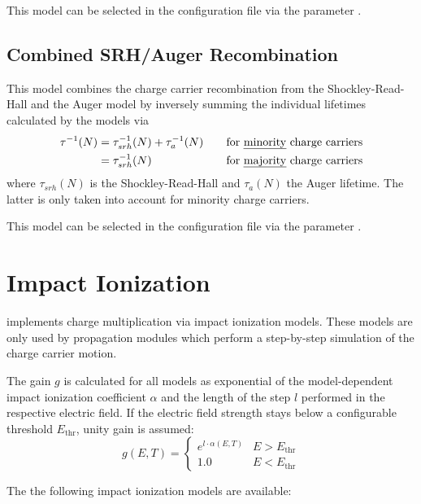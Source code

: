 This model can be selected in the configuration file via the parameter .

\subsection{Combined SRH/Auger Recombination}

This model combines the charge carrier recombination from the Shockley-Read-Hall and the Auger model by inversely summing the individual lifetimes calculated by the models via
\begin{align}
    \label{eq:recom:combined}
    \tau^{-1}(N) &= \tau_{srh}^{-1}(N) + \tau_{a}^{-1}(N) &\quad \textrm{for \emph{minority} charge carriers} \nonumber \\
              &= \tau_{srh}^{-1}(N) &\quad \textrm{for \emph{majority} charge carriers}
\end{align}
where $\tau_{srh}(N)$ is the Shockley-Read-Hall and $\tau_{a}(N)$ the Auger lifetime.
The latter is only taken into account for minority charge carriers.

This model can be selected in the configuration file via the parameter .


\section{Impact Ionization}
\label{sec:multiplication}

\apsq implements charge multiplication via impact ionization models.
These models are only used by propagation modules which perform a step-by-step simulation of the charge carrier motion.

The gain $g$ is calculated for all models as exponential of the model-dependent impact ionization coefficient $\alpha$ and the length of the step $l$ performed in the respective electric field.
If the electric field strength stays below a configurable threshold $E_{\textrm{thr}}$, unity gain is assumed:
\begin{equation}
    \label{eq:multiplication}
    g (E, T) = \left\{
    \begin{array}{ll}
        e^{l \cdot \alpha(E, T)} & E > E_{\textrm{thr}}\\
        1.0 & E < E_{\textrm{thr}}
    \end{array}
    \right.
\end{equation}

The the following impact ionization models are available:

